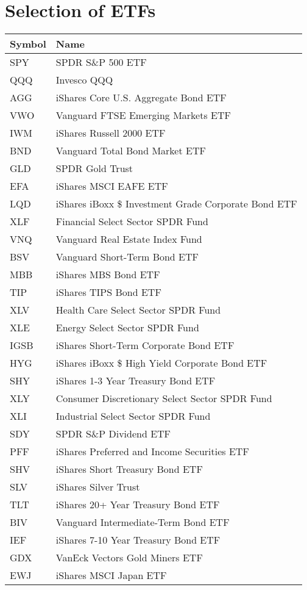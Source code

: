 \chapter{Selection of ETFs}
\label{appendix:etfs_corr}
\par
\begin{longtable}{|| m{2cm}| m{11.5cm}||}
\hline
Symbol & Name  \\ \hline \hline
SPY & SPDR S\&P 500 ETF \\ \hline
QQQ & Invesco QQQ \\ \hline
AGG & iShares Core U.S. Aggregate Bond ETF \\ \hline
VWO & Vanguard FTSE Emerging Markets ETF \\ \hline
IWM & iShares Russell 2000 ETF \\ \hline
BND & Vanguard Total Bond Market ETF \\ \hline
GLD & SPDR Gold Trust \\ \hline
EFA & iShares MSCI EAFE ETF \\ \hline
LQD & iShares iBoxx \$ Investment Grade Corporate Bond ETF \\ \hline
XLF & Financial Select Sector SPDR Fund \\ \hline
VNQ & Vanguard Real Estate Index Fund \\ \hline
BSV & Vanguard Short-Term Bond ETF \\ \hline
MBB & iShares MBS Bond ETF \\ \hline
TIP & iShares TIPS Bond ETF \\ \hline
XLV & Health Care Select Sector SPDR Fund \\ \hline
XLE & Energy Select Sector SPDR Fund \\ \hline
IGSB & iShares Short-Term Corporate Bond ETF \\ \hline
HYG & iShares iBoxx \$ High Yield Corporate Bond ETF \\ \hline
SHY & iShares 1-3 Year Treasury Bond ETF \\ \hline
XLY & Consumer Discretionary Select Sector SPDR Fund \\ \hline
XLI & Industrial Select Sector SPDR Fund \\ \hline
SDY & SPDR S\&P Dividend ETF \\ \hline
PFF & iShares Preferred and Income Securities ETF \\ \hline
SHV & iShares Short Treasury Bond ETF \\ \hline
SLV & iShares Silver Trust \\ \hline
TLT & iShares 20+ Year Treasury Bond ETF \\ \hline
BIV & Vanguard Intermediate-Term Bond ETF \\ \hline
IEF & iShares 7-10 Year Treasury Bond ETF \\ \hline
GDX & VanEck Vectors Gold Miners ETF \\ \hline
EWJ & iShares MSCI Japan ETF \\ \hline \hline


  
\end{longtable}